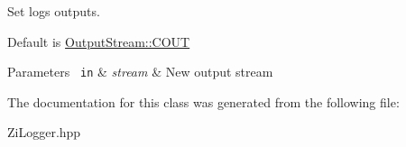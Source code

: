 Set logs outputs. 

Default is \mbox{\hyperlink{classZiApi_1_1ZiLogger_a0c544845c83a82d59454407e154634c2a5822f620df7e1c3829eabe17ea69afbf}{Output\+Stream\+::\+C\+O\+UT}} 
\begin{DoxyParams}[1]{Parameters}
\mbox{\texttt{ in}}  & {\em stream} & New output stream \\
\hline
\end{DoxyParams}


The documentation for this class was generated from the following file\+:\begin{DoxyCompactItemize}
\item 
Zi\+Logger.\+hpp\end{DoxyCompactItemize}
